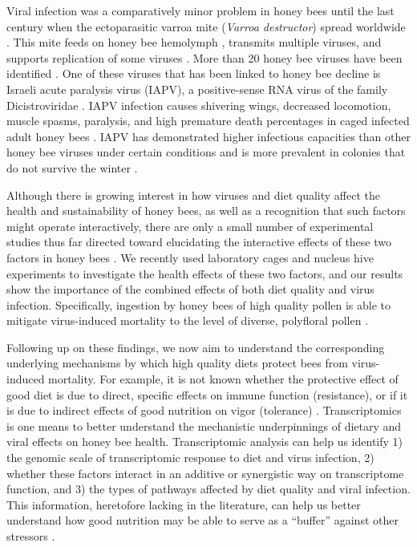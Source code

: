 \documentclass{bmcart}
\begin{document}
\begin{linenumbers}
\begin{doublespacing}
Viral infection was a comparatively minor problem in honey bees until the last century when the ectoparasitic varroa mite (\textit{Varroa destructor}) spread worldwide \cite{miteSpread}. This mite feeds on honey bee hemolymph \cite{hemolymph}, transmits multiple viruses, and supports replication of some viruses \cite{miteVirus, miteVirus2, miteVirus3, newVR}. More than 20 honey bee viruses have been identified \cite{numVirus}. One of these viruses that has been linked to honey bee decline is Israeli acute paralysis virus (IAPV), a positive-sense RNA virus of the family Dicistroviridae \cite{fam}. IAPV infection causes shivering wings, decreased locomotion, muscle spasms, paralysis, and high premature death percentages in caged infected adult honey bees \cite{symptoms}. IAPV has demonstrated higher infectious capacities than other honey bee viruses under certain conditions \cite{carrillo} and is more prevalent in colonies that do not survive the winter \cite{winter}.

Although there is growing interest in how viruses and diet quality affect the health and sustainability of honey bees, as well as a recognition that such factors might operate interactively, there are only a small number of experimental studies thus far directed toward elucidating the interactive effects of these two factors in honey bees \cite{intNV, intNV2, intNV3, interactingDV, interactingDV2}. We recently used laboratory cages and nucleus hive experiments to investigate the health effects of these two factors, and our results show the importance of the combined effects of both diet quality and virus infection. Specifically, ingestion by honey bees of high quality pollen is able to mitigate virus-induced mortality to the level of diverse, polyfloral pollen \cite{adamInt}. 

Following up on these findings, we now aim to understand the corresponding underlying mechanisms by which high quality diets protect bees from virus-induced mortality. For example, it is not known whether the protective effect of good diet is due to direct, specific effects on immune function (resistance), or if it is due to indirect effects of good nutrition on vigor (tolerance) \cite{resTol1}. Transcriptomics is one means to better understand the mechanistic underpinnings of dietary and viral effects on honey bee health. Transcriptomic analysis can help us identify 1) the genomic scale of transcriptomic response to diet and virus infection, 2) whether these factors interact in an additive or synergistic way on transcriptome function, and 3) the types of pathways affected by diet quality and viral infection. This information, heretofore lacking in the literature, can help us better understand how good nutrition may be able to serve as a ``buffer'' against other stressors \cite{AdamTothReview}.


\end{doublespacing}
\end{linenumbers}
\end{document}
